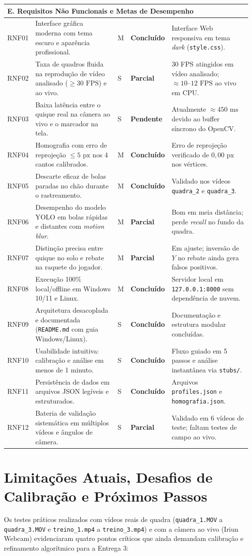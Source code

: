 \documentclass[a4paper,11pt]{article}
\newcommand{\stok}{\textcolor{acerto}{\textbf{Concluído}}}
\newcommand{\stpar}{\textcolor{parcial}{\textbf{Parcial}}}
\newcommand{\stpen}{\textcolor{erro}{\textbf{Pendente}}}
\newcommand{\req}[5]{#1 & #2 & \centering #3 & \centering #4 & #5 \\ \hline}
\newcommand{\reccat}[1]{\multicolumn{5}{|l|}{\cellcolor{blue!14}\textbf{#1}} \\ \hline}
\begin{document}
\begin{center}
\begin{longtable}{|p{1.1cm}|p{6.8cm}|p{0.7cm}|p{1.6cm}|p{4.8cm}|}
\reccat{E. Requisitos Não Funcionais e Metas de Desempenho}
\req{RNF01}{Interface gráfica moderna com tema escuro e aparência profissional.}{M}{\stok}{Interface Web responsiva em tema \textit{dark} (\texttt{style.css}).}
\req{RNF02}{Taxa de quadros fluida na reprodução de vídeo analisado ($\geq 30\text{ FPS}$) e ao vivo.}{S}{\stpar}{30 FPS atingidos em vídeo analisado; $\approx 10\text{--}12\text{ FPS}$ ao vivo em CPU.}
\req{RNF03}{Baixa latência entre o quique real na câmera ao vivo e o marcador na tela.}{S}{\stpen}{Atualmente $\approx 450\text{ ms}$ devido ao buffer síncrono do OpenCV.}
\req{RNF04}{Homografia com erro de reprojeção $\leq 5\text{ px}$ nos 4 cantos calibrados.}{M}{\stok}{Erro de reprojeção verificado de $0{,}00\text{ px}$ nos vértices.}
\req{RNF05}{Descarte eficaz de bolas paradas no chão durante o rastreamento.}{M}{\stok}{Validado nos vídeos \texttt{quadra\_2} e \texttt{quadra\_3}.}
\req{RNF06}{Desempenho do modelo YOLO em bolas rápidas e distantes com \textit{motion blur}.}{M}{\stpar}{Bom em meia distância; perde \textit{recall} no fundo da quadra.}
\req{RNF07}{Distinção precisa entre quique no solo e rebate na raquete do jogador.}{M}{\stpar}{Em ajuste; inversão de $Y$ no rebate ainda gera falsos positivos.}
\req{RNF08}{Execução 100\% local/offline em Windows 10/11 e Linux.}{M}{\stok}{Servidor local em \texttt{127.0.0.1:8000} sem dependência de nuvem.}
\req{RNF09}{Arquitetura desacoplada e documentada (\texttt{README.md} com guia Windows/Linux).}{S}{\stok}{Documentação e estrutura modular concluídas.}
\req{RNF10}{Usabilidade intuitiva: calibração e análise em menos de 1 minuto.}{S}{\stok}{Fluxo guiado em 5 passos e análise instantânea via \texttt{stubs/}.}
\req{RNF11}{Persistência de dados em arquivos JSON legíveis e estruturados.}{S}{\stok}{Arquivos \texttt{profiles.json} e \texttt{homografia.json}.}
\req{RNF12}{Bateria de validação sistemática em múltiplos vídeos e ângulos de câmera.}{S}{\stpar}{Validado em 6 vídeos de teste; faltam testes de campo ao vivo.}
\end{longtable}
\end{center}

\section{Limitações Atuais, Desafios de Calibração e Próximos Passos}
Os testes práticos realizados com vídeos reais de quadra (\texttt{quadra\_1.MOV} a \texttt{quadra\_3.MOV} e \texttt{treino\_1.mp4} a \texttt{treino\_3.mp4}) e com a câmera ao vivo (Iriun Webcam) evidenciaram quatro pontos críticos que ainda demandam calibração e refinamento algorítmico para a Entrega 3:
\end{document}
